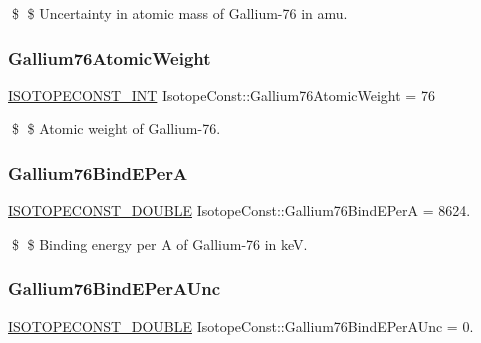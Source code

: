 \$ \$ Uncertainty in atomic mass of Gallium-\/76 in amu. \mbox{\label{group___isotope_const-_gallium-_ga76_ga386274b4901fea76d9e98e924ad3f6b3}} 
\subsubsection{\texorpdfstring{Gallium76\+Atomic\+Weight}{Gallium76AtomicWeight}}
{\footnotesize\ttfamily \mbox{\hyperlink{group___isotope_const-_macros_ga5f18360b3e99483a35c32d789e62621c}{I\+S\+O\+T\+O\+P\+E\+C\+O\+N\+S\+T\+\_\+\+I\+NT}} Isotope\+Const\+::\+Gallium76\+Atomic\+Weight = 76}

\$ \$ Atomic weight of Gallium-\/76. \mbox{\label{group___isotope_const-_gallium-_ga76_gacf2561c03dd1b9288c4bc4fbfd8f156b}} 
\subsubsection{\texorpdfstring{Gallium76\+Bind\+E\+PerA}{Gallium76BindEPerA}}
{\footnotesize\ttfamily \mbox{\hyperlink{group___isotope_const-_macros_ga8f45a7272ce02c0b4c65c44636ed719a}{I\+S\+O\+T\+O\+P\+E\+C\+O\+N\+S\+T\+\_\+\+D\+O\+U\+B\+LE}} Isotope\+Const\+::\+Gallium76\+Bind\+E\+PerA = 8624.}

\$ \$ Binding energy per A of Gallium-\/76 in keV. \mbox{\label{group___isotope_const-_gallium-_ga76_ga78cd3e3f2139cf31c55a8eccdab4e34b}} 
\subsubsection{\texorpdfstring{Gallium76\+Bind\+E\+Per\+A\+Unc}{Gallium76BindEPerAUnc}}
{\footnotesize\ttfamily \mbox{\hyperlink{group___isotope_const-_macros_ga8f45a7272ce02c0b4c65c44636ed719a}{I\+S\+O\+T\+O\+P\+E\+C\+O\+N\+S\+T\+\_\+\+D\+O\+U\+B\+LE}} Isotope\+Const\+::\+Gallium76\+Bind\+E\+Per\+A\+Unc = 0.}

